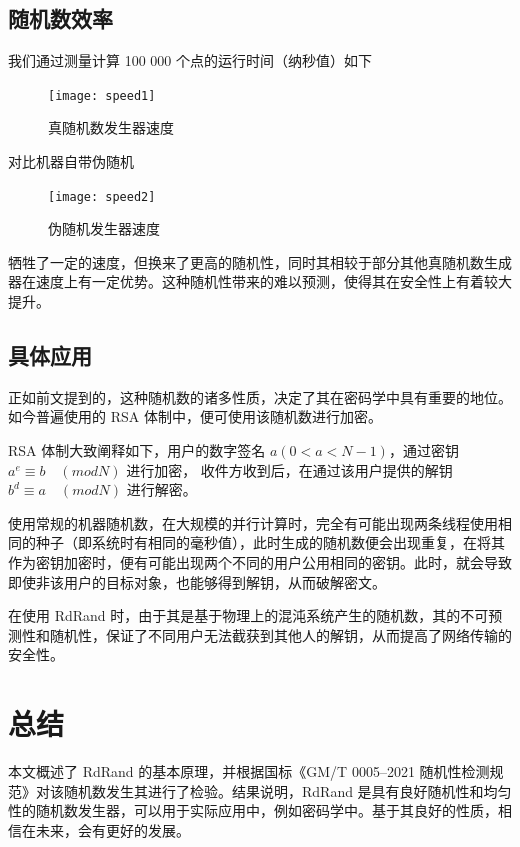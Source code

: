 \documentclass[12pt,a4paper]{article}%
\begin{document}
    \subsection{随机数效率}
    我们通过测量计算 100 000 个点的运行时间（纳秒值）如下

    \begin{figure}[h]
        \centering
        \texttt{[image: speed1]}
        \caption{真随机数发生器速度}
    \end{figure}

    对比机器自带伪随机

    \begin{figure}[h]
        \centering
        \texttt{[image: speed2]}
        \caption{伪随机发生器速度}
    \end{figure}

    牺牲了一定的速度，但换来了更高的随机性，同时其相较于部分其他真随机数生成器在速度上有一定优势。这种随机性带来的难以预测，使得其在安全性上有着较大提升。

    \subsection{具体应用}
    正如前文提到的，这种随机数的诸多性质，决定了其在密码学中具有重要的地位。如今普遍使用的 RSA 体制中，便可使用该随机数进行加密。

    RSA 体制大致阐释如下，用户的数字签名 \(a (0 < a < N - 1)\)，通过密钥 \(a^e \equiv b \quad (mod N)\) 进行加密， 收件方收到后，在通过该用户提供的解钥 \(b^d \equiv a \quad (mod N)\) 进行解密。

    使用常规的机器随机数，在大规模的并行计算时，完全有可能出现两条线程使用相同的种子（即系统时有相同的毫秒值），此时生成的随机数便会出现重复，在将其作为密钥加密时，便有可能出现两个不同的用户公用相同的密钥。此时，就会导致即使非该用户的目标对象，也能够得到解钥，从而破解密文。

    在使用 RdRand 时，由于其是基于物理上的混沌系统产生的随机数，其的不可预测性和随机性，保证了不同用户无法截获到其他人的解钥，从而提高了网络传输的安全性。


    \section{总结}
    本文概述了 RdRand 的基本原理，并根据国标《GM/T 0005--2021 随机性检测规范》对该随机数发生其进行了检验。结果说明，RdRand 是具有良好随机性和均匀性的随机数发生器，可以用于实际应用中，例如密码学中。基于其良好的性质，相信在未来，会有更好的发展。
\end{document}
